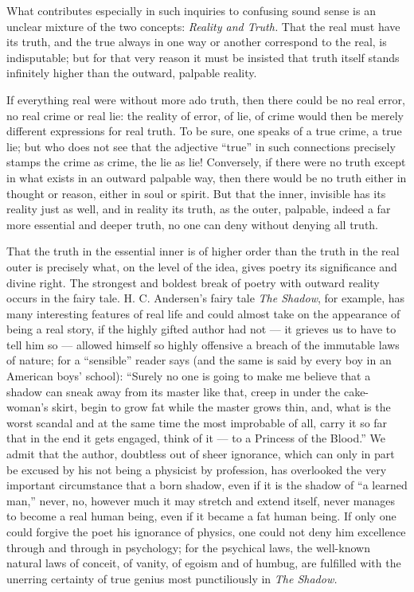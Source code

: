 \documentclass[12pt,a4paper,openany]{book}
\newcommand{\opage}[1]{\marginnote{\footnotesize\textit{[#1]}}}
\begin{document}
What contributes especially in such inquiries
\setcounter{footnote}{0}%
\opage{292}to confusing sound sense is an unclear mixture
of the two concepts: \emph{Reality and Truth.} That
the real must have its truth, and the true always
in one way or another correspond to the real, is
indisputable; but for that very reason it must be insisted
that truth itself stands infinitely higher than the outward,
palpable reality.

If everything real were without more ado truth,
then there could be no real error,
no real crime or real lie: the reality
of error, of lie, of crime would then
be merely different expressions for real truth. To be sure,
one speaks of a true crime, a true lie;
but who does not see that the adjective ``true'' in such connections
precisely stamps the crime as crime,
the lie as lie! Conversely, if there were no truth
except in what exists in an outward palpable way,
then there would be no truth either in thought
or reason, either in soul or spirit. But that
the inner, invisible has its reality just as well, and in
reality its truth, as the outer, palpable,
indeed a far more essential and deeper truth, no
one can deny without denying all truth.

That the truth in the essential inner is of higher
order than the truth in the real outer is precisely
what, on the level of the idea, gives poetry its significance
and divine right. The strongest and boldest
break of poetry with outward reality occurs in the fairy tale. H.
C. Andersen's fairy tale \emph{The Shadow}, for example, has many interesting
features of real life and could almost
take on the appearance of being a real story, if
\setcounter{footnote}{0}%
\opage{293}the highly gifted author had not --- it grieves us
to have to tell him so --- allowed himself so highly
offensive a breach of the immutable laws of nature; for
a ``sensible'' reader says (and the same is said by every
boy in an American boys' school): ``Surely no one
is going to make me believe that a shadow can
sneak away from its master like that, creep in under the cake-woman's
skirt, begin to grow fat while the master grows
thin, and, what is the worst scandal and at the same time
the most improbable of all, carry it so far that in the end it gets engaged, think of it --- to a Princess of the
Blood.'' We admit that the author, doubtless out of sheer
ignorance, which can only in part be excused by
his not being a physicist by profession, has overlooked the very
important circumstance that a born shadow, even if it
is the shadow of ``a learned man,'' never, no, however
much it may stretch and extend itself, never
manages to become a real human being, even if it
became a fat human being. If only one could forgive the poet
his ignorance of physics, one could not deny
him excellence through and through in psychology;
for the psychical laws, the well-known natural laws of conceit, of vanity,
of egoism and of humbug,
are fulfilled with the unerring
certainty of true genius most punctiliously in \emph{The Shadow.}
\end{document}
